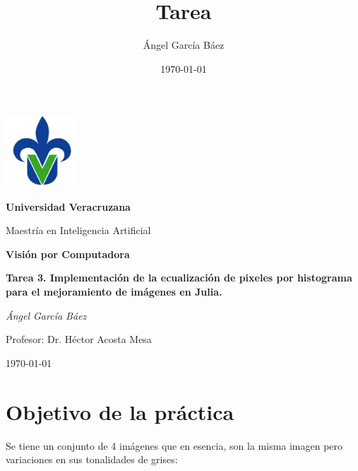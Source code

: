 \documentclass[11pt, letterpaper]{article}
\title{\bfseries Tarea}
\author{Ángel García Báez}
\date{\today}
\begin{document}
	
	\begin{titlepage}
		\centering
		\includegraphics[width=0.2\textwidth]{logo.png}\par
		\vspace{1cm}
		{\LARGE \bfseries Universidad Veracruzana \par}
		\vspace{1cm}
		{\Large Maestría en Inteligencia Artificial\par}
		\vspace{3cm}
		{\LARGE \bfseries Visión por Computadora \par}
		\vspace{1cm}
		{\Large \bfseries Tarea 3. Implementación de la ecualización de pixeles por histograma para el mejoramiento de imágenes en Julia. \par}
		\vfill
		{\Large \textit{Ángel García Báez}\par}
		\vspace{1cm}
		{\Large Profesor: Dr. Héctor Acosta Mesa\par}
		\vfill
		{\Large \today \par}
	\end{titlepage}
	
	\newpage
	\tableofcontents
	\newpage
	
	\section{Objetivo de la práctica}
	
Se tiene un conjunto de 4 imágenes que en esencia, son la misma imagen pero variaciones en sus tonalidades de grises:
\end{document}
